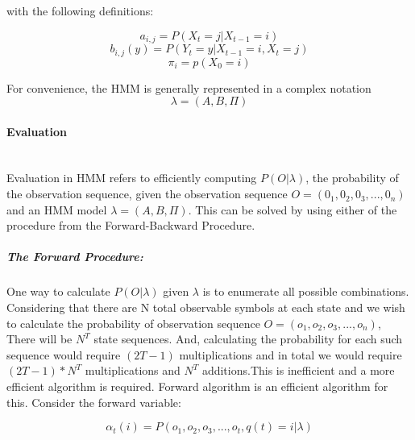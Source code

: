 with the following definitions:

\begin{equation} a _{i,j} = P(X _{t} = j | X _{t-1} = i ) \end{equation}
\begin{equation} b _{i,j}(y) = P(Y _{t} = y | X _{t-1} = i ,  X _{t} = j ) \end{equation}
\begin{equation} \pi _{i} = p(X _{0} = i) \end{equation}

For convenience, the HMM is generally represented in a complex notation
\begin{equation} \lambda = (A,B, \Pi ) \end{equation}

\paragraph{Evaluation} \mbox{}\\
Evaluation in HMM refers to efficiently computing $ P(O|\lambda) $, the probability of the observation sequence, given the observation sequence $ O = (0 _{1}, 0 _{2},0 _{3},...,0 _{n}) $ and an HMM model $ \lambda = (A,B, \Pi ) $. This can be solved by using either of the procedure from the Forward-Backward Procedure.
\subparagraph{The Forward Procedure:}
One way to calculate $ P(O|\lambda) $ given $ \lambda $ is to enumerate all possible combinations. Considering that there are N total observable symbols at each state and we
wish to calculate the probability of observation sequence $ O = (o _{1}, o _{2},o _{3},...,o _{n}) $, There will be $ N^{T} $ state sequences. And, calculating the probability for each such sequence would require $(2T -1)$ multiplications and in total we would require $(2T -1) * N^{T} $ multiplications and $ N^{T} $ additions.This is inefficient and a more efficient algorithm is required. Forward algorithm is
an efficient algorithm for this. Consider the forward variable: 

\begin{equation} \alpha _{t} (i) = P(o _{1}, o _{2},o _{3},...,o _{t},q(t) = i|\lambda)  \end{equation}

